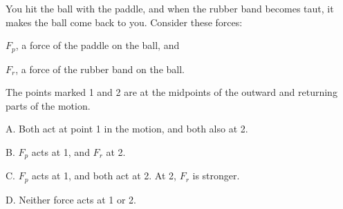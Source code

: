 \begin{qu}
\num{} You hit the ball with the paddle,
and when the rubber band becomes taut, it makes the ball come back to you.
Consider these forces:

$F_p$, a force of the paddle on the ball, and

$F_r$, a force of the rubber band on the ball.

\noindent The points marked 1 and 2 are at the midpoints of the
outward and returning parts of the motion.

\noindent A. Both act at point 1 in the motion, and both also at 2.

\noindent B. $F_p$ acts at 1, and $F_r$ at 2.

\noindent C. $F_p$ acts at 1, and both act at 2. At 2, $F_r$ is stronger.

\noindent D. Neither force acts at 1 or 2.

\end{qu}
